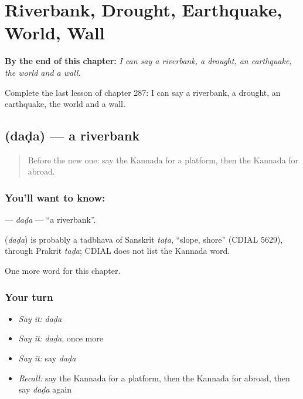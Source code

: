
\chapter{Riverbank, Drought, Earthquake, World, Wall}
\label{ch:ka-riverbank-drought-earthquake-world-wall}

\begin{chapteropening}
\textbf{By the end of this chapter:} \emph{I can say a riverbank, a drought, an earthquake, the world and a wall.}

Complete the last lesson of chapter 287: I can say a riverbank, a drought, an earthquake, the world and a wall.
\end{chapteropening}

\section[\texorpdfstring{\kn{ದಡ} (daḍa)}{ದಡ (daḍa)}]{ (daḍa) — a riverbank}

\label{lesson:KA-C287-dada}



\begin{quote}
Before the new one: say the Kannada for a platform, then the Kannada for abroad.
\end{quote}

\subsection*{You'll want to know: }
\textbf{} — \emph{daḍa} — \textquotedblleft{}a riverbank\textquotedblright{}.

\begin{cousinweb}
\textbf{} (\emph{daḍa}) is probably a tadbhava of Sanskrit \emph{taṭa}, \textquotedblleft{}slope, shore\textquotedblright{} (CDIAL 5629), through Prakrit \emph{taḍa}; CDIAL does not list the Kannada word.
\end{cousinweb}

\begin{grammarlens}[title={What you've built}]
One more word for this chapter.
\end{grammarlens}

\subsection*{Your turn}
\begin{itemize}
\raggedright
  \item \emph{Say it:} \emph{daḍa}
  \item \emph{Say it:} \emph{daḍa}, once more
  \item \emph{Say it:} say \emph{daḍa}
  \item \emph{Recall:} say the Kannada for a platform, then the Kannada for abroad, then say \emph{daḍa} again
\end{itemize}

